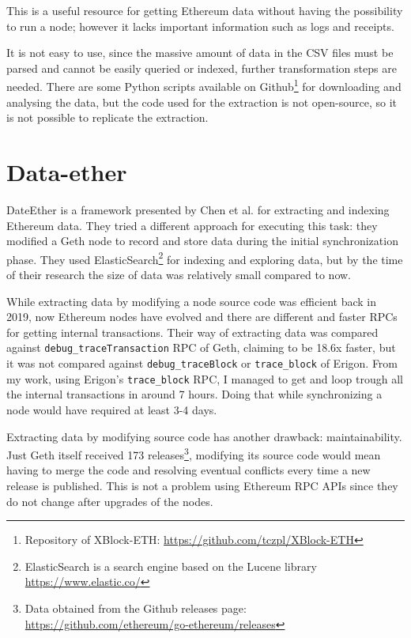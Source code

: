 This is a useful resource for getting Ethereum data without having the possibility to run a node; however it lacks important information such as logs and receipts. 

It is not easy to use, since the massive amount of data in the CSV files must be parsed and cannot be easily queried or indexed, further transformation steps are needed. There are some Python scripts available on Github\footnote{Repository of XBlock-ETH: \url{https://github.com/tczpl/XBlock-ETH}} for downloading and analysing the data, but the code used for the extraction is not open-source, so it is not possible to replicate the extraction.

\section{Data-ether}

DateEther \cite{dataether} is a framework presented by Chen et al. for extracting and indexing Ethereum data. They tried a different approach for executing this task: they modified a Geth node to record and store data during the initial synchronization phase. They used ElasticSearch\footnote{ElasticSearch is a search engine based on the Lucene library \url{https://www.elastic.co/}} for indexing and exploring data, but by the time of their research the size of data was relatively small compared to now.

While extracting data by modifying a node source code was efficient back in 2019, now Ethereum nodes have evolved and there are different and faster RPCs for getting internal transactions. Their way of extracting data was compared against \texttt{debug\_traceTransaction} RPC of Geth, claiming to be 18.6x faster, but it was not compared against \texttt{debug\_traceBlock} or \texttt{trace\_block} of Erigon. From my work, using Erigon's \texttt{trace\_block} RPC, I managed to get and loop trough all the internal transactions in around 7 hours. Doing that while synchronizing a node would have required at least 3-4 days. 

Extracting data by modifying source code has another drawback: maintainability. Just Geth itself received 173 releases\footnote{Data obtained from the Github releases page: \url{https://github.com/ethereum/go-ethereum/releases}}, modifying its source code would mean having to merge the code and resolving eventual conflicts every time a new release is published. This is not a problem using Ethereum RPC APIs since they do not change after upgrades of the nodes.

